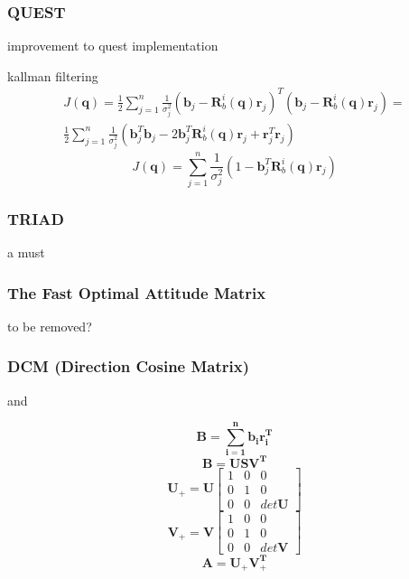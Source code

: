 \documentclass[12pt,a4paper,oneside]{article}
\begin{document}
\subsubsection{QUEST}
improvement to quest implementation \cite{RIS_1} \par
kallman filtering \cite{shuster1990kalman}
\begin{equation}
\begin{split}
J(\bm{q}) = \frac{1}{2}\sum_{j=1}^n\frac{1}{\sigma_j^2}(\bm{b}_j - \bm{R}_b^i(\bm{q})\bm{r}_j)^T(\bm{b}_j - \bm{R}_b^i(\bm{q})\bm{r}_j) = \\
\frac{1}{2}\sum_{j=1}^n\frac{1}{\sigma_j^2}(\bm{b}_j^T\bm{b}_j - 2\bm{b}_j^T\bm{R}_b^i(\bm{q})\bm{r}_j + \bm{r}_j^T\bm{r}_j)
\end{split}
\end{equation}
\begin{equation}
J(\bm{q}) = \sum_{j=1}^n\frac{1}{\sigma_j^2}(1 - \bm{b}_j^T\bm{R}_b^i(\bm{q})\bm{r}_j)
\end{equation}
\subsubsection{TRIAD}
a must
\subsubsection{The Fast Optimal Attitude Matrix}
to be removed?
\subsubsection{DCM (Direction Cosine Matrix)}
\cite{juang2003efficient}
 and

\cite{6187242}
\begin{equation}
\bm{B = \sum_{i=1}^nb_ir_i^T}
\end{equation}
\begin{equation}
\bm{B = USV^T}
\end{equation}
\begin{equation}
\bm{U}_+ = \bm{U}\begin{bmatrix}
1 & 0 & 0 \\
0 & 1 & 0 \\
0 & 0 & det\bm{U}
\end{bmatrix}
\end{equation}
\begin{equation}
\bm{V}_+ = \bm{V}\begin{bmatrix}
1 & 0 & 0 \\
0 & 1 & 0 \\
0 & 0 & det\bm{V}
\end{bmatrix}
\end{equation}
\begin{equation}
\bm{A = U_+V_+^T}
\end{equation}
\newpage
\end{document}
